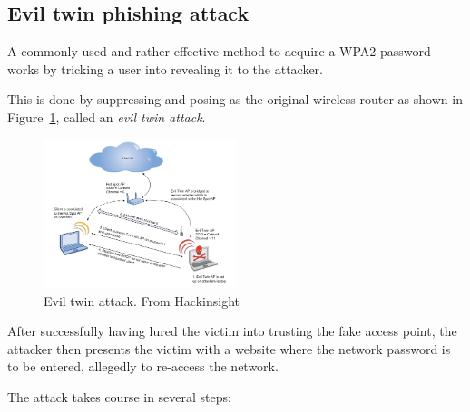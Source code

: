 \subsection{Evil twin phishing attack}\label{sec:eviltwin}

A commonly used and rather effective method to acquire a WPA2 password works by tricking a user into revealing it to the attacker.

This is done by suppressing and posing as the original wireless router as shown in Figure~\ref{fig:eviltwin}, called an \emph{evil twin attack}.

\begin{figure}
\includegraphics[width=0.5\textwidth]{src/img/38_1.jpg}
\caption{Evil twin attack. From Hackinsight~\cite{Hackinsight14}}\label{fig:eviltwin}
\end{figure}

After successfully having lured the victim into trusting the fake access point, the attacker then presents the victim with a website where the network password is to be entered, allegedly to re-access the network.

The attack takes course in several steps:

